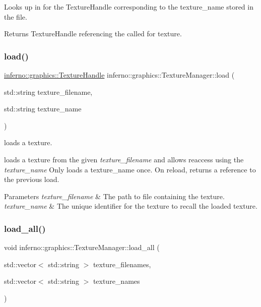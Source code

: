 Looks up in for the Texture\+Handle corresponding to the texture\+\_\+name stored in the file. \begin{DoxyReturn}{Returns}
Texture\+Handle referencing the called for texture. 
\end{DoxyReturn}
\mbox{\label{classinferno_1_1graphics_1_1_texture_manager_ab3a97b088af8a322cd88b0fe4c57a350}} 
\subsubsection{\texorpdfstring{load()}{load()}}
{\footnotesize\ttfamily \mbox{\hyperlink{namespaceinferno_1_1graphics_a9d719bfbfedd17b9ace9b8d603ab5a38}{inferno\+::graphics\+::\+Texture\+Handle}} inferno\+::graphics\+::\+Texture\+Manager\+::load (\begin{DoxyParamCaption}\item[{std\+::string}]{texture\+\_\+filename,  }\item[{std\+::string}]{texture\+\_\+name }\end{DoxyParamCaption})}



loads a texture. 

loads a texture from the given {\itshape texture\+\_\+filename} and allows reaccess using the {\itshape texture\+\_\+name} Only loads a texture\+\_\+name once. On reload, returns a reference to the previous load. 
\begin{DoxyParams}{Parameters}
{\em texture\+\_\+filename} & The path to file containing the texture. \\
\hline
{\em texture\+\_\+name} & The unique identifier for the texture to recall the loaded texture. \\
\hline
\end{DoxyParams}
\mbox{\label{classinferno_1_1graphics_1_1_texture_manager_a66e9bc4c559810895c3ecc96ed0d4158}} 
\subsubsection{\texorpdfstring{load\+\_\+all()}{load\_all()}}
{\footnotesize\ttfamily void inferno\+::graphics\+::\+Texture\+Manager\+::load\+\_\+all (\begin{DoxyParamCaption}\item[{std\+::vector$<$ std\+::string $>$}]{texture\+\_\+filenames,  }\item[{std\+::vector$<$ std\+::string $>$}]{texture\+\_\+names }\end{DoxyParamCaption})}



